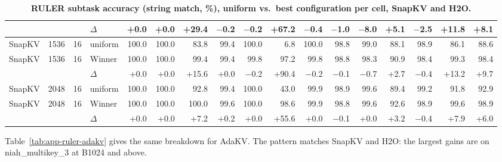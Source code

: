 \begin{table}[t]
\begin{tabular}{@{}l r r l r r r r r r r r r r r r r @{}}
     &  &  & $\Delta$ & +0.0 & +0.0 & +29.4 & $-$0.2 & $-$0.2 & +67.2 & $-$0.4 & $-$1.0 & $-$8.0 & +5.1 & $-$2.5 & +11.8 & +8.1 \\
    \midrule
    SnapKV & 1536 & 16 & uniform & 100.0 & 100.0 & 83.8 & 99.4 & 100.0 & 6.8 & 100.0 & 98.8 & 99.0 & 88.1 & 98.9 & 86.1 & 88.6 \\
    SnapKV & 1536 & 16 & Winner & 100.0 & 100.0 & 99.4 & 99.4 & 99.8 & 97.2 & 99.8 & 98.8 & 98.3 & 90.9 & 98.4 & 99.3 & 98.4 \\
     &  &  & $\Delta$ & +0.0 & +0.0 & +15.6 & +0.0 & $-$0.2 & +90.4 & $-$0.2 & $-$0.1 & $-$0.7 & +2.7 & $-$0.4 & +13.2 & +9.7 \\
    \midrule
    SnapKV & 2048 & 16 & uniform & 100.0 & 100.0 & 92.8 & 99.4 & 100.0 & 43.0 & 99.9 & 98.9 & 99.6 & 89.4 & 99.2 & 91.8 & 92.9 \\
    SnapKV & 2048 & 16 & Winner & 100.0 & 100.0 & 100.0 & 99.6 & 100.0 & 98.6 & 99.9 & 98.8 & 99.6 & 92.6 & 98.9 & 99.6 & 98.9 \\
     &  &  & $\Delta$ & +0.0 & +0.0 & +7.2 & +0.2 & +0.0 & +55.6 & +0.0 & $-$0.1 & +0.0 & +3.2 & $-$0.4 & +7.9 & +6.0 \\
    \bottomrule
  \end{tabular}
  \caption{\textbf{RULER subtask accuracy (string match, \%), uniform vs.\ best configuration per cell, SnapKV and H2O.}}
  \label{tab:app-ruler}
\end{table}


Table~\ref{tab:app-ruler-adakv} gives the same breakdown for AdaKV. The pattern matches SnapKV and H2O: the largest gains are on niah\_multikey\_3 at B1024 and above.

